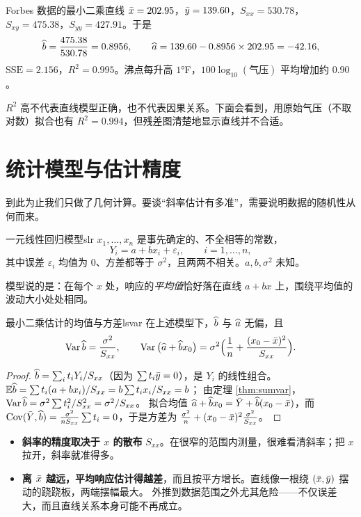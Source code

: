 \begin{casestudy}{Forbes 数据的最小二乘直线}
$\bar{x}=202.95$，$\bar{y}=139.60$，$S_{xx}=530.78$，$S_{xy}=475.38$，$S_{yy}=427.91$。于是
\[
\widehat{b}=\frac{475.38}{530.78}=0.8956,\qquad \widehat{a}=139.60-0.8956\times202.95=-42.16,
\]
$\mathrm{SSE}=2.156$，$R^2=0.995$。沸点每升高 $1$°F，$100\log_{10}(\text{气压})$ 平均增加约 $0.90$。
\end{casestudy}

\begin{warning}
$R^2$ 高不代表直线模型正确，也不代表因果关系。下面会看到，用原始气压（不取对数）拟合也有 $R^2=0.994$，但残差图清楚地显示直线并不合适。
\end{warning}

\section{统计模型与估计精度}

到此为止我们只做了几何计算。要谈“斜率估计有多准”，需要说明数据的随机性从何而来。

\begin{definition}{一元线性回归模型}{slr}
$x_1,\dots,x_n$ 是事先确定的、不全相等的常数，
\[
Y_i=a+bx_i+\varepsilon_i,\qquad i=1,\dots,n,
\]
其中误差 $\varepsilon_i$ 均值为 $0$、方差都等于 $\sigma^2$，且两两不相关。$a,b,\sigma^2$ 未知。
\end{definition}

模型说的是：在每个 $x$ 处，响应的\emph{平均值}恰好落在直线 $a+bx$ 上，围绕平均值的波动大小处处相同。

\begin{theorem}{最小二乘估计的均值与方差}{lsvar}
在上述模型下，$\widehat{b}$ 与 $\widehat{a}$ 无偏，且
\[
\operatorname{Var}\widehat{b}=\frac{\sigma^2}{S_{xx}},\qquad
\operatorname{Var}\big(\widehat{a}+\widehat{b}x_0\big)=\sigma^2\Big(\frac1n+\frac{(x_0-\bar{x})^2}{S_{xx}}\Big).
\]
\end{theorem}
\begin{proof}
$\widehat{b}=\sum_it_iY_i/S_{xx}$（因为 $\sum t_i\bar{y}=0$），是 $Y_i$ 的线性组合。$\mathbb{E}\widehat{b}=\sum t_i(a+bx_i)/S_{xx}=b\sum t_ix_i/S_{xx}=b$；
由定理 \ref{thm:sumvar}，$\operatorname{Var}\widehat{b}=\sigma^2\sum t_i^2/S_{xx}^2=\sigma^2/S_{xx}$。
拟合均值 $\widehat{a}+\widehat{b}x_0=\bar{Y}+\widehat{b}(x_0-\bar{x})$，而 $\operatorname{Cov}(\bar{Y},\widehat{b})=\frac{\sigma^2}{nS_{xx}}\sum t_i=0$，于是方差为 $\frac{\sigma^2}n+(x_0-\bar{x})^2\frac{\sigma^2}{S_{xx}}$。
\end{proof}

\begin{intuition}[这两个公式告诉了我们什么]
\begin{itemize}
\item \textbf{斜率的精度取决于 $x$ 的散布} $S_{xx}$。在很窄的范围内测量，很难看清斜率；把 $x$ 拉开，斜率就准得多。
\item \textbf{离 $\bar{x}$ 越远，平均响应估计得越差}，而且按平方增长。直线像一根绕 $(\bar{x},\bar{y})$ 摆动的跷跷板，两端摆幅最大。
外推到数据范围之外尤其危险——不仅误差大，而且直线关系本身可能不再成立。
\end{itemize}
\end{intuition}

